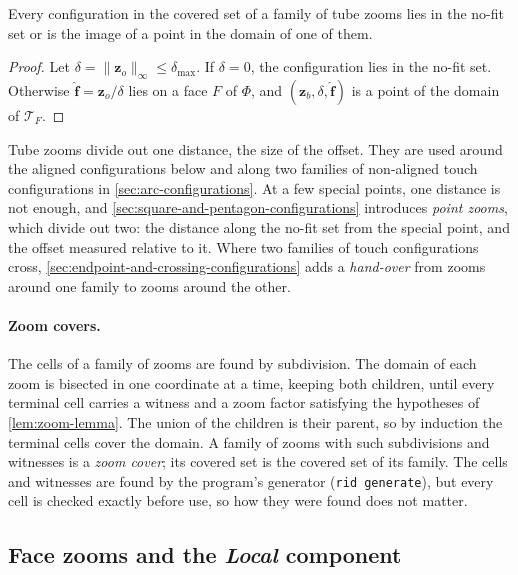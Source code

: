 \begin{lemma}\label{lem:tube-coverage}
  Every configuration in the covered set of a family of tube zooms lies in
  the no-fit set or is the image of a point in the domain of one of them.
\end{lemma}
\begin{proof}
  Let $\delta=\lVert\mathbf z_o\rVert_\infty\le\delta_{\max}$. If $\delta=0$, the
  configuration lies in the no-fit set. Otherwise
  $\widehat{\mathbf f}=\mathbf z_o/\delta$ lies on a face $F$ of $\Phi$, and
  $(\mathbf z_b,\delta,\widehat{\mathbf f})$ is a point of the domain of
  $\mathcal T_F$.
\end{proof}

Tube zooms divide out one distance, the size of the offset. They are used
around the aligned configurations below and along two families of
non-aligned touch configurations in \cref{sec:arc-configurations}. At a few
special points, one distance is not enough, and
\cref{sec:square-and-pentagon-configurations} introduces \emph{point zooms},
which divide out two: the distance along the no-fit set from the special
point, and the offset measured relative to it. Where two families of touch
configurations cross, \cref{sec:endpoint-and-crossing-configurations} adds
a \emph{hand-over} from zooms around one family to zooms around the other.

\paragraph{Zoom covers.}
The cells of a family of zooms are found by subdivision. The domain of
each zoom is bisected in one coordinate at a time, keeping both children,
until every terminal cell carries a witness and a zoom factor satisfying
the hypotheses of \cref{lem:zoom-lemma}. The union of the children is their
parent, so by induction the terminal cells cover the domain. A family of
zooms with such subdivisions and witnesses is a \emph{zoom cover}; its
covered set is the covered set of its family. The cells and witnesses are
found by the program's generator (\texttt{rid generate}), but every cell is checked exactly before use,
so how they were found does not matter.

\subsection{Face zooms and the \emph{Local} component}\label{subsec:face-zooms-and-the-local-component}

